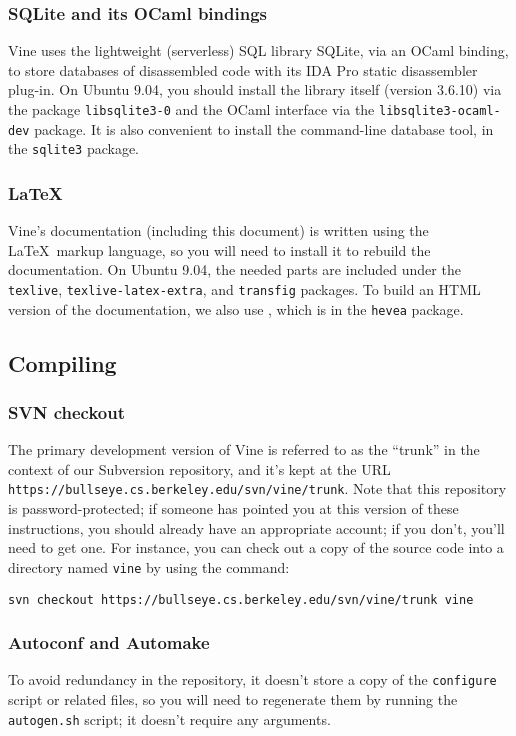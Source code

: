 \documentclass[11pt,onecolumn]{article}
\let\url\nolinkurl %
\begin{document}
\begin{svn}
\subsubsection{SQLite and its OCaml bindings}

Vine uses the lightweight (serverless) SQL library SQLite, via an
OCaml binding, to store databases of disassembled code with its IDA Pro
static disassembler plug-in.
%
On Ubuntu 9.04, you should install the library itself (version 3.6.10)
via the package {\tt libsqlite3-0} and the OCaml interface via the
{\tt libsqlite3-ocaml-dev} package.
%
It is also convenient to install the command-line database tool, in
the {\tt sqlite3} package.
\end{svn}

\subsubsection{\LaTeX}

Vine's documentation (including this document) is written using the
\LaTeX\ markup language, so you will need to install it to rebuild the
documentation.
%
On Ubuntu 9.04, the needed parts are included under the {\tt texlive},
{\tt texlive-latex-extra}, and {\tt transfig} packages.
%
To build an HTML version of the documentation, we also use \hevea,
which is in the {\tt hevea} package.

\subsection{Compiling}

\begin{svn}
\subsubsection{SVN checkout}

The primary development version of Vine is referred to as the
``trunk'' in the context of our Subversion repository, and it's kept
at the URL \url{https://bullseye.cs.berkeley.edu/svn/vine/trunk}.
%
Note that this repository is password-protected; if someone has
pointed you at this version of these instructions, you should already
have an appropriate account; if you don't, you'll need to get one.
%
For instance, you can check out a copy of the source code into a
directory named {\tt vine} by using the command:

\begin{Verbatim}[frame=lines, framesep=.5em]
svn checkout https://bullseye.cs.berkeley.edu/svn/vine/trunk vine
\end{Verbatim}

\subsubsection{Autoconf and Automake}

To avoid redundancy in the repository, it doesn't store a copy of the
{\tt configure} script or related files, so you will need to
regenerate them by running the {\tt autogen.sh} script; it doesn't
require any arguments.
\end{svn}
\end{document}
